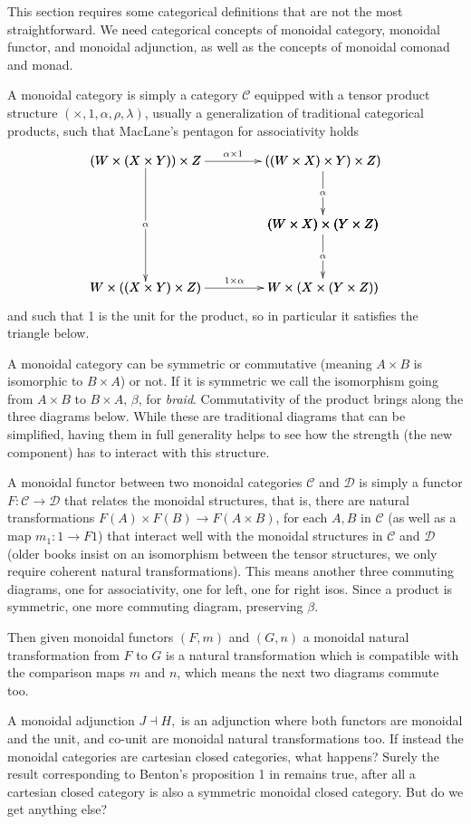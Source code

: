 \documentclass{article}
\let\mto\to
\let\to\relax
\newcommand{\to}{\rightarrow}
\newcommand{\cat}[1]{\mathcal{#1}}
\begin{document}
This section requires  some categorical definitions that are not the most straightforward.  We need categorical concepts of monoidal category, monoidal functor, and monoidal adjunction, as well as the concepts of monoidal comonad and monad. 

A monoidal category is simply a category $\cat{C}$  equipped with a tensor product structure $(\times, 1, \alpha, \rho, \lambda)$, usually a generalization of traditional categorical products, such that  MacLane's pentagon for associativity holds
\[ \bfig
      \vSquares|ammmmma|/>``>```>`>/[(W \times (X \times Y))\times Z `((W \times X) \times Y)\times Z)``(W\times X)\times (Y\times Z)`W \times ((X \times Y)\times Z)`W \times (X \times (Y\times Z));\alpha\times 1``\alpha```\alpha`1\times \alpha]
      \morphism(0,1000)|m|/->/<0,-950>[`;\alpha]
      \efig\]
    and such that 1 is the unit for the product, so in particular it satisfies the triangle below.
    \[ \]
    
    
  A monoidal category can be symmetric or commutative (meaning $A\times B$ is isomorphic to $B\times A$) or not. If it is symmetric we call the isomorphism going from $ A\times B$ to $B\times A$, $\beta$, for  \textit{braid}. 
       Commutativity of the product brings along the three diagrams below. While these are traditional diagrams that can be simplified, having them in full generality helps to see how the strength (the new component) has to interact with this structure.

A monoidal functor between two monoidal categories $\cat{C}$ and $\cat{D}$ is simply a functor $F\colon \cat{C} \mto \cat{D}$ that relates the monoidal structures, that is, there are natural transformations  $F(A)\times F(B)\mto F(A \times B)$, for each $A,B$ in $\cat{C}$ (as well as a map $m_{1}\colon 1 \mto F1$) that interact well with the monoidal structures  in $\cat{C}$ and  $\cat{D}$ (older books insist on an isomorphism between the tensor structures, we only require coherent natural transformations). This means another three commuting diagrams, one for associativity, one for left, one for right isos. Since a product is symmetric, one more commuting diagram, preserving $\beta$.

Then given monoidal functors $(F,m)$ and $(G,n)$ a monoidal natural transformation from $F$ to $G$ is a natural transformation which is compatible with the comparison maps $m$ and $n$, which means the next two diagrams commute too.

A monoidal adjunction $J \dashv H, $ is an adjunction  where both functors are monoidal and the unit, and co-unit are monoidal natural transformations too. If instead the monoidal categories are cartesian closed categories, what happens? Surely the result corresponding to Benton's proposition 1 in \cite{benton1995} remains true, after all a cartesian closed category is also a symmetric monoidal closed category. But do we get anything else?
\end{document}
